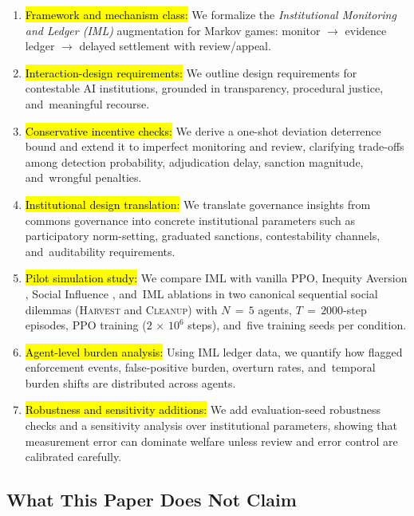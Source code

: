 \documentclass[mca,article,accept,pdftex,oneauthor]{Definitions/mdpi}
\begin{document}
\begin{enumerate}[leftmargin=*] %
\item \hl{Framework and mechanism class:} We formalize the \emph{Institutional Monitoring and Ledger (IML)} augmentation for Markov games: monitor $\rightarrow$ evidence ledger $\rightarrow$ delayed settlement with review/appeal.
\item \hl{Interaction-design requirements:} We outline design requirements for contestable AI institutions, grounded in transparency, procedural justice, and~meaningful recourse.
\item \hl{Conservative incentive checks:} We derive a one-shot deviation deterrence bound and extend it to imperfect monitoring and review, clarifying trade-offs among detection probability, adjudication delay, sanction magnitude, and~wrongful penalties.
\item \hl{Institutional design translation:} We translate governance insights from commons governance into concrete institutional parameters such as participatory norm-setting, graduated sanctions, contestability channels, and~auditability requirements.
\item \hl{Pilot simulation study:} We compare IML with vanilla PPO, Inequity Aversion \citep{Hughes2018InequityAversion}, Social Influence \citep{Jaques2019SocialInfluence}, and~IML ablations in two canonical sequential social dilemmas (\textsc{Harvest} and \textsc{Cleanup}) with $N\,{=}\,5$ agents, $T\,{=}\,2000$-step episodes, PPO training ($2\,{\times}\,10^6$ steps), and~five training seeds per condition.
\item \hl{Agent-level burden analysis:} Using IML ledger data, we quantify how flagged enforcement events, false-positive burden, overturn rates, and~temporal burden shifts are distributed across agents.
\item \hl{Robustness and sensitivity additions:} We add evaluation-seed robustness checks and a sensitivity analysis over institutional parameters, showing that measurement error can dominate welfare unless review and error control are calibrated carefully.
\end{enumerate}

\subsection{What This Paper Does Not Claim}
\label{sec:nonclaims}
\end{document}

